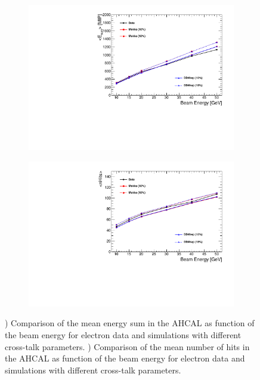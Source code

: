 \begin{figure}[htbp!]
  \centering
  \begin{subfigure}[t]{0.49\textwidth}
    \includegraphics[width=1.\linewidth]{../Thesis_Plots/Timing/Electrons/Plots/EsumElectrons_BeamEnergy.pdf}
    \caption{} \label{fig:EsumMean}
  \end{subfigure}
  \hfill
  \begin{subfigure}[t]{0.49\textwidth}
    \includegraphics[width=1.\linewidth]{../Thesis_Plots/Timing/Electrons/Plots/nHitsElectrons_BeamEnergy.pdf}
    \caption{} \label{fig:nHitsMean}
  \end{subfigure}
  \caption{) Comparison of the mean energy sum in the AHCAL as function of the beam energy for electron data and simulations with different cross-talk parameters. ) Comparison of the mean number of hits in the AHCAL as function of the beam energy for electron data and simulations with different cross-talk parameters.}
  \label{fig:eVal}
\end{figure}

